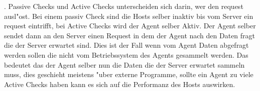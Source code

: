 \autocite{zabbix:activepassive}. Passive Checks und Active Checks unterscheiden sich darin, wer den request %
ausl"ost. Bei einem passiv Check sind die Hosts selber inaktiv bis vom Server ein request eintrifft, bei Active %
Checks wird der Agent selber Aktiv. Der Agent selber sendet dann an den Server einen Request in dem der Agent nach den %
Daten fragt die der Server erwartet sind\autocite{zabbix:activepassive2}. %
Dies ist der Fall wenn vom Agent Daten abgefragt werden sollen die nicht vom %
Betriebssystem des Agents gesammelt werden. Das bedeutet das der Agent selber nun die Daten die der Server erwartet %
sammeln muss, dies geschieht meistens "uber externe Programme, sollte ein Agent zu viele Active Checks haben kann es %
sich auf die Performanz des Hosts auswirken. \ \\ %

